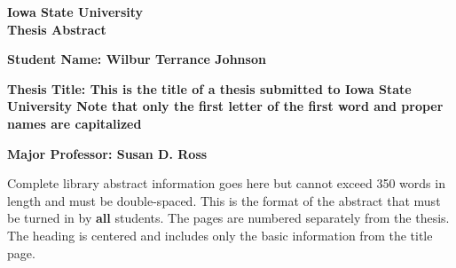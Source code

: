 \documentclass[11pt]{report}
\newcommand{\abauthor}[1]
  {\noindent \bfseries Student Name: \mdseries #1 \vspace*{.1 in}}
\newcommand{\abtitle}[1]
  {\noindent \bfseries Thesis Title: \mdseries #1 \vspace*{.1 in}}
\newcommand{\abmprof}[1]
  {\noindent \bfseries Major Professor: \mdseries #1}
\newcommand{\abmprofs}[2]
  {\noindent \bfseries Co-Major Professors: \mdseries #1 and #2}
\begin{document}
\begin{center}
\bfseries
Iowa State University\\
Thesis Abstract
\end{center}

\abauthor{Wilbur Terrance Johnson}

\abtitle{This is the title of a thesis
submitted to Iowa State University
Note that only the first letter of
the first word and proper names
are capitalized}

\abmprof{Susan D. Ross}
\vspace*{.5 in}

Complete library abstract information goes here but cannot exceed
350 words in length and must be double-spaced.
This is the format of the abstract that must
be turned in by \textbf{all} students.  The pages are numbered separately
from the thesis.  The heading is centered and includes only the basic information
from the title page.
\end{document}
